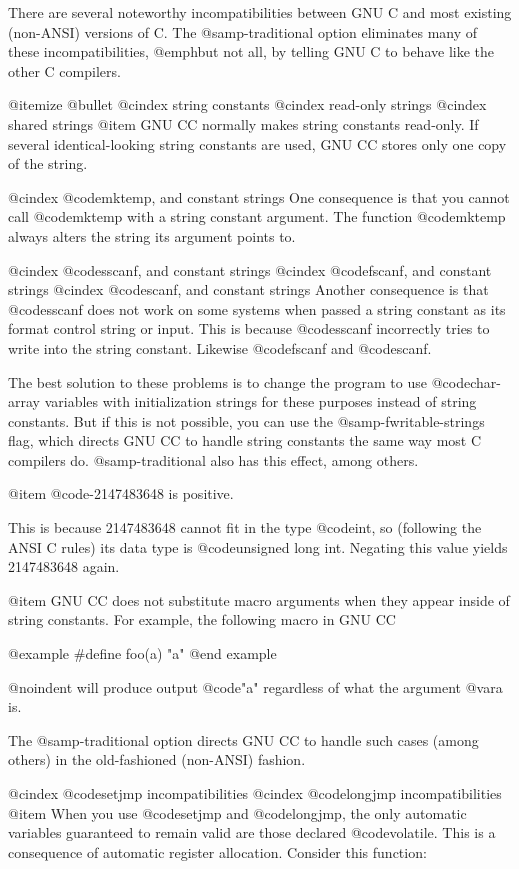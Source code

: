 There are several noteworthy incompatibilities between GNU C and most
existing (non-ANSI) versions of C.  The @samp{-traditional} option
eliminates many of these incompatibilities, @emph{but not all}, by
telling GNU C to behave like the other C compilers.

@itemize @bullet
@cindex string constants
@cindex read-only strings
@cindex shared strings
@item
GNU CC normally makes string constants read-only.  If several
identical-looking string constants are used, GNU CC stores only one
copy of the string.

@cindex @code{mktemp}, and constant strings
One consequence is that you cannot call @code{mktemp} with a string
constant argument.  The function @code{mktemp} always alters the
string its argument points to.

@cindex @code{sscanf}, and constant strings
@cindex @code{fscanf}, and constant strings
@cindex @code{scanf}, and constant strings
Another consequence is that @code{sscanf} does not work on some systems
when passed a string constant as its format control string or input.
This is because @code{sscanf} incorrectly tries to write into the string
constant.  Likewise @code{fscanf} and @code{scanf}.

The best solution to these problems is to change the program to use
@code{char}-array variables with initialization strings for these
purposes instead of string constants.  But if this is not possible,
you can use the @samp{-fwritable-strings} flag, which directs GNU CC
to handle string constants the same way most C compilers do.
@samp{-traditional} also has this effect, among others.

@item
@code{-2147483648} is positive.

This is because 2147483648 cannot fit in the type @code{int}, so
(following the ANSI C rules) its data type is @code{unsigned long int}.
Negating this value yields 2147483648 again.

@item
GNU CC does not substitute macro arguments when they appear inside of
string constants.  For example, the following macro in GNU CC

@example
#define foo(a) "a"
@end example

@noindent
will produce output @code{"a"} regardless of what the argument @var{a} is.

The @samp{-traditional} option directs GNU CC to handle such cases
(among others) in the old-fashioned (non-ANSI) fashion.

@cindex @code{setjmp} incompatibilities
@cindex @code{longjmp} incompatibilities
@item
When you use @code{setjmp} and @code{longjmp}, the only automatic
variables guaranteed to remain valid are those declared
@code{volatile}.  This is a consequence of automatic register
allocation.  Consider this function:

